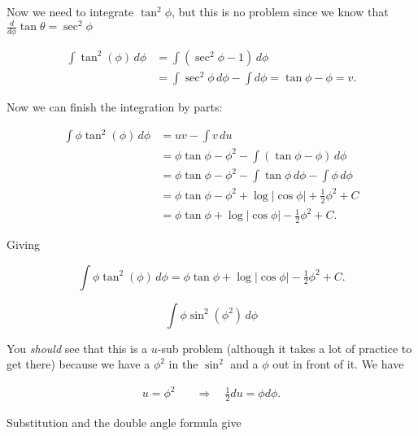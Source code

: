 \documentclass[12pt, letterpaper]{article}
\begin{document}
Now we need to integrate $\tan^2{\phi}$, but this is no problem since we know that $\frac{d}{d\phi}\tan{\theta} = \sec^2{\phi}$

\begin{equation*}
\begin{aligned}
\int \tan^2{\left( \phi  \right)} \, d\phi
  &= \int \left( \sec^2{\phi} - 1 \right) \, d\phi \\[0.2in]
  &= \int \sec^2{\phi} \, d\phi - \int d\phi = \tan{\phi} - \phi = v.
\end{aligned}
\end{equation*}

Now we can finish the integration by parts:

\begin{equation*}
\begin{aligned}
\int \phi \tan^2{\left( \phi  \right)} \, d\phi
  &= uv - \int v \, du \\[0.2in]
  &= \phi\tan{\phi} - \phi^2 - \int \left( \tan{\phi} - \phi \right) \, d\phi \\[0.2in]
  &= \phi\tan{\phi} - \phi^2 - \int \tan{\phi}\, d\phi - \int \phi \, d\phi \\[0.2in]
  &= \phi\tan{\phi} - \phi^2 + \log{|\cos{\phi}|} + \tfrac{1}{2}\phi^2 + C \\[0.2in]
  &= \phi\tan{\phi} + \log{|\cos{\phi}|} - \tfrac{1}{2}\phi^2 + C.
\end{aligned}
\end{equation*}

Giving

\begin{equation*}
\boxed
{
\int \phi \tan^2{\left( \phi  \right)} \, d\phi
  = \phi\tan{\phi} + \log{|\cos{\phi}|} - \tfrac{1}{2}\phi^2 + C.
}
\end{equation*}


\newpage

$$ \int \phi \sin^2{\left( \phi^2 \right)} \, d\phi $$

You \emph{should} see that this is a $u$-sub problem (although it takes a lot of practice to get there) because we have a $\phi^2$ in the $\sin^2$ and a $\phi$ out in front of it. We have

\begin{equation*}
\begin{aligned}
u = \phi^2 \quad &\Rightarrow \quad \tfrac{1}{2}du = \phi d\phi.
\end{aligned}
\end{equation*}

Substitution and the double angle formula give
\end{document}
